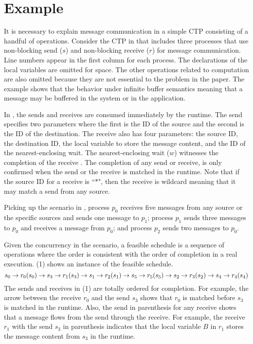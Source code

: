 \section{Example}

\examplefigone

It is necessary to explain message communication in a simple CTP consisting of a handful of operations. Consider the CTP in  that includes three processes that use non-blocking send ($s$) and non-blocking receive ($r$) for message communication. Line numbers appear in the first column for each process. The declarations of the local variables are omitted for space. The other operations related to computation are also omitted because they are not essential to the problem in the paper.
The example shows that the behavior under infinite buffer semantics meaning that a message may be buffered in the system or in the application.

In , the sends and receives are consumed immediately by the runtime. The send specifies two parameters where the first is the ID of the source and the second is the ID of the destination. The receive also has four parameters: the source ID, the destination ID, the local variable to store the message content, and the ID of the nearest-enclosing wait. The nearest-enclosing wait ($w$) witnesses the completion of the receive \cite{}. The completion of any send or receive, is only confirmed when the send or the receive is matched in the runtime. Note that if the source ID for a receive is ``$\ast$", then the receive is wildcard meaning that it may match a send from any source. 

Picking up the scenario in , process $p_0$ receives five messages from any source or the specific sources and sends one message to $p_1$; process $p_1$ sends three messages to $p_0$ and receives a message from $p_0$; and process $p_2$ sends two messages to $p_0$. 

Given the concurrency in the scenario, a feasible schedule is a sequence of operations where the order is consistent with the order of completion in a real execution. (1) shows an instance of the feasible schedule. 
\begin{equation}
\scriptsize
s_0\rightarrow r_0 (s_0)\rightarrow s_3\rightarrow r_1 (s_3)\rightarrow s_1\rightarrow r_2 (s_1)\rightarrow 
s_5\rightarrow r_5 (s_5)\rightarrow s_2\rightarrow r_3 (s_2)\rightarrow s_4\rightarrow r_4 (s_4)
\end{equation} 
The sends and receives in (1) are totally ordered for completion. For example, the arrow between the receive $r_0$ and the send $s_3$ shows that $r_0$ is matched before $s_3$ is matched in the runtime. 
Also, the send in parenthesis for any receive shows that a message flows from the send through the receive. 
For example, the receive $r_1$ with the send $s_3$ in parenthesis indicates that the local variable $B$ in $r_1$ stores the message content from $s_3$ in the runtime. 

